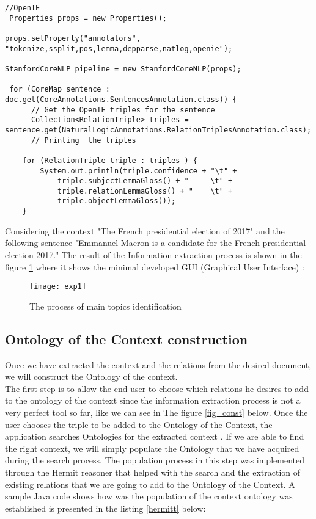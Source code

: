 \newpage

\begin{lstlisting}[captionpos=b, caption=Information extraction process definition in Java, label={openieDefinition},
basicstyle=\footnotesize,frame=single]
 //OpenIE
 Properties props = new Properties();

props.setProperty("annotators", "tokenize,ssplit,pos,lemma,depparse,natlog,openie");

StanfordCoreNLP pipeline = new StanfordCoreNLP(props);

 for (CoreMap sentence : doc.get(CoreAnnotations.SentencesAnnotation.class)) {
      // Get the OpenIE triples for the sentence
      Collection<RelationTriple> triples = sentence.get(NaturalLogicAnnotations.RelationTriplesAnnotation.class);
      // Printing  the triples 

    for (RelationTriple triple : triples ) {
        System.out.println(triple.confidence + "\t" +
            triple.subjectLemmaGloss() + "     \t" +
            triple.relationLemmaGloss() + "    \t" +
            triple.objectLemmaGloss());
    }        
\end{lstlisting}

Considering the context "The French presidential election of 2017" and the following sentence
"Emmanuel Macron is a candidate for the French presidential election 2017." The result of the Information extraction process is shown in the figure \ref{fig_ie} where it shows the minimal developed GUI (Graphical User Interface)  :

\newpage

\begin{figure}[htpb]
\centering
\texttt{[image: exp1]}
\caption{The process of main topics identification }
\label{fig_ie}
\end{figure}

\subsection{Ontology of the Context construction}

Once we have extracted the context and the relations from the desired document, we will construct the Ontology of the context.  \\
The first step is to allow the end user to choose which relations he desires to add to the ontology of the context since the information extraction process is not a very perfect tool so far, like we can see in The figure \ref{fig_const} below.
Once the user chooses the triple to be added to the Ontology of the Context, the application searches Ontologies for the extracted context . If we are able to find the right context, we will simply populate the Ontology that we have acquired during the search process. The population process in this step was implemented through the Hermit reasoner that helped with the search and the extraction of existing relations that we are going to add to the Ontology of the Context. A sample Java code shows how was the population of the context ontology was established is presented in the listing \ref{hermitt} below: \\

